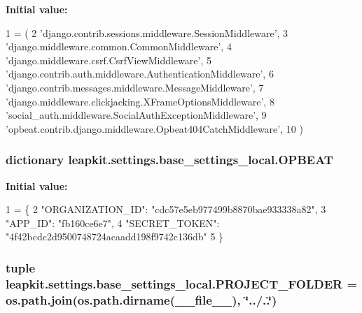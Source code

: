 {\bfseries Initial value\-:}
\begin{DoxyCode}
1 = (
2     \textcolor{stringliteral}{'django.contrib.sessions.middleware.SessionMiddleware'},
3     \textcolor{stringliteral}{'django.middleware.common.CommonMiddleware'},
4     \textcolor{stringliteral}{'django.middleware.csrf.CsrfViewMiddleware'},
5     \textcolor{stringliteral}{'django.contrib.auth.middleware.AuthenticationMiddleware'},
6     \textcolor{stringliteral}{'django.contrib.messages.middleware.MessageMiddleware'},
7     \textcolor{stringliteral}{'django.middleware.clickjacking.XFrameOptionsMiddleware'},
8     \textcolor{stringliteral}{'social\_auth.middleware.SocialAuthExceptionMiddleware'},
9     \textcolor{stringliteral}{'opbeat.contrib.django.middleware.Opbeat404CatchMiddleware'},
10 )
\end{DoxyCode}
\hypertarget{namespaceleapkit_1_1settings_1_1base__settings__local_a1167f7a2b6005e88c2b66a1257ce665c}{
\subsubsection[{O\-P\-B\-E\-A\-T}]{\setlength{\rightskip}{0pt plus 5cm}dictionary leapkit.\-settings.\-base\-\_\-settings\-\_\-local.\-O\-P\-B\-E\-A\-T}}\label{namespaceleapkit_1_1settings_1_1base__settings__local_a1167f7a2b6005e88c2b66a1257ce665c}
{\bfseries Initial value\-:}
\begin{DoxyCode}
1 = \{
2     \textcolor{stringliteral}{"ORGANIZATION\_ID"}: \textcolor{stringliteral}{"cdc57e5eb977499b8870bae933338a82"},
3     \textcolor{stringliteral}{"APP\_ID"}: \textcolor{stringliteral}{"fb160ce6e7"},
4     \textcolor{stringliteral}{"SECRET\_TOKEN"}: \textcolor{stringliteral}{"4f42bcdc2d9500748724acaadd198f9742c136db"}
5 \}
\end{DoxyCode}
\hypertarget{namespaceleapkit_1_1settings_1_1base__settings__local_a7683d01d853ba8d1db18d71d0ef9760f}{
\subsubsection[{P\-R\-O\-J\-E\-C\-T\-\_\-\-F\-O\-L\-D\-E\-R}]{\setlength{\rightskip}{0pt plus 5cm}tuple leapkit.\-settings.\-base\-\_\-settings\-\_\-local.\-P\-R\-O\-J\-E\-C\-T\-\_\-\-F\-O\-L\-D\-E\-R = os.\-path.\-join(os.\-path.\-dirname(\-\_\-\-\_\-file\-\_\-\-\_\-), \char`\"{}../..\char`\"{})}}\label{namespaceleapkit_1_1settings_1_1base__settings__local_a7683d01d853ba8d1db18d71d0ef9760f}
